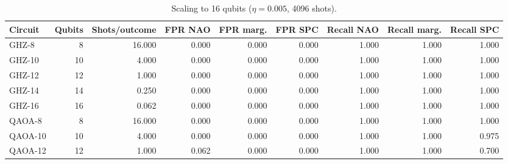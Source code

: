 \begin{table}[t]
\centering
\caption{Scaling to 16 qubits ($\eta = 0.005$, 4096 shots).}
\label{tab:rq4-scaling}
\small
\begin{tabular}{lrrrrrrrr}
\toprule
Circuit & Qubits & Shots/outcome & FPR NAO & FPR marg. & FPR SPC & Recall NAO & Recall marg. & Recall SPC \\
\midrule
GHZ-8 & 8 & 16.000 & 0.000 & 0.000 & 0.000 & 1.000 & 1.000 & 1.000 \\
GHZ-10 & 10 & 4.000 & 0.000 & 0.000 & 0.000 & 1.000 & 1.000 & 1.000 \\
GHZ-12 & 12 & 1.000 & 0.000 & 0.000 & 0.000 & 1.000 & 1.000 & 1.000 \\
GHZ-14 & 14 & 0.250 & 0.000 & 0.000 & 0.000 & 1.000 & 1.000 & 1.000 \\
GHZ-16 & 16 & 0.062 & 0.000 & 0.000 & 0.000 & 1.000 & 1.000 & 1.000 \\
QAOA-8 & 8 & 16.000 & 0.000 & 0.000 & 0.000 & 1.000 & 1.000 & 1.000 \\
QAOA-10 & 10 & 4.000 & 0.000 & 0.000 & 0.000 & 1.000 & 1.000 & 0.975 \\
QAOA-12 & 12 & 1.000 & 0.062 & 0.000 & 0.000 & 1.000 & 1.000 & 0.700 \\
\bottomrule
\end{tabular}
\end{table}
